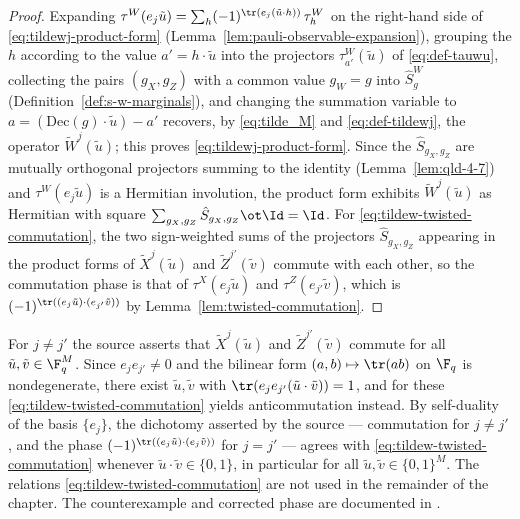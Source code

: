 \begin{proof}
	\leanok
	Expanding $\tau^W(e_j \tilde{u}) = \sum_{h} (-1)^{\tr(e_j (\tilde{u} \cdot h))}\, \tau^W_h$ on the right-hand side of \eqref{eq:tildewj-product-form} (Lemma~\ref{lem:pauli-observable-expansion}), grouping the $h$ according to the value $a' = h \cdot \tilde{u}$ into the projectors $\tau^W_{a'}(\tilde{u})$ of \eqref{eq:def-tauwu}, collecting the pairs $(g_X,g_Z)$ with a common value $g_W = g$ into $\hat{S}^W_g$ (Definition~\ref{def:s-w-marginals}), and changing the summation variable to $a = (\mathrm{Dec}(g) \cdot \tilde{u}) - a'$ recovers, by \eqref{eq:tilde_M} and \eqref{eq:def-tildewj}, the operator $\tilde{W}^j(\tilde{u})$; this proves \eqref{eq:tildewj-product-form}. Since the $\hat{S}_{g_X,g_Z}$ are mutually orthogonal projectors summing to the identity (Lemma~\ref{lem:qld-4-7}) and $\tau^W(e_j \tilde{u})$ is a Hermitian involution, the product form exhibits $\tilde{W}^j(\tilde{u})$ as Hermitian with square $\sum_{g_X,g_Z} \hat{S}_{g_X,g_Z} \ot \Id = \Id$. For \eqref{eq:tildew-twisted-commutation}, the two sign-weighted sums of the projectors $\hat{S}_{g_X,g_Z}$ appearing in the product forms of $\tilde{X}^j(\tilde{u})$ and $\tilde{Z}^{j'}(\tilde{v})$ commute with each other, so the commutation phase is that of $\tau^X(e_j \tilde{u})$ and $\tau^Z(e_{j'} \tilde{v})$, which is $(-1)^{\tr((e_j \tilde{u}) \cdot (e_{j'} \tilde{v}))}$ by Lemma~\ref{lem:twisted-commutation}.
\end{proof}

\begin{remark}\label{rem:qld-cross-phase}
	For $j \neq j'$ the source asserts that $\tilde{X}^j(\tilde{u})$ and $\tilde{Z}^{j'}(\tilde{v})$ commute for all $\tilde{u}, \tilde{v} \in \F_q^M$. Since $e_j e_{j'} \neq 0$ and the bilinear form $(a,b) \mapsto \tr(ab)$ on $\F_q$ is nondegenerate, there exist $\tilde{u}, \tilde{v}$ with $\tr(e_j e_{j'} (\tilde{u} \cdot \tilde{v})) = 1$, and for these \eqref{eq:tildew-twisted-commutation} yields anticommutation instead. By self-duality of the basis $\{e_j\}$, the dichotomy asserted by the source --- commutation for $j \neq j'$, and the phase $(-1)^{\tr((e_j\tilde{u}) \cdot (e_j\tilde{v}))}$ for $j = j'$ --- agrees with \eqref{eq:tildew-twisted-commutation} whenever $\tilde{u} \cdot \tilde{v} \in \{0,1\}$, in particular for all $\tilde{u}, \tilde{v} \in \{0,1\}^M$. The relations \eqref{eq:tildew-twisted-commutation} are not used in the remainder of the chapter.
	The counterexample and corrected phase are documented in
	\cite{gap:qpbt_cross-basis-phase}.
\end{remark}

